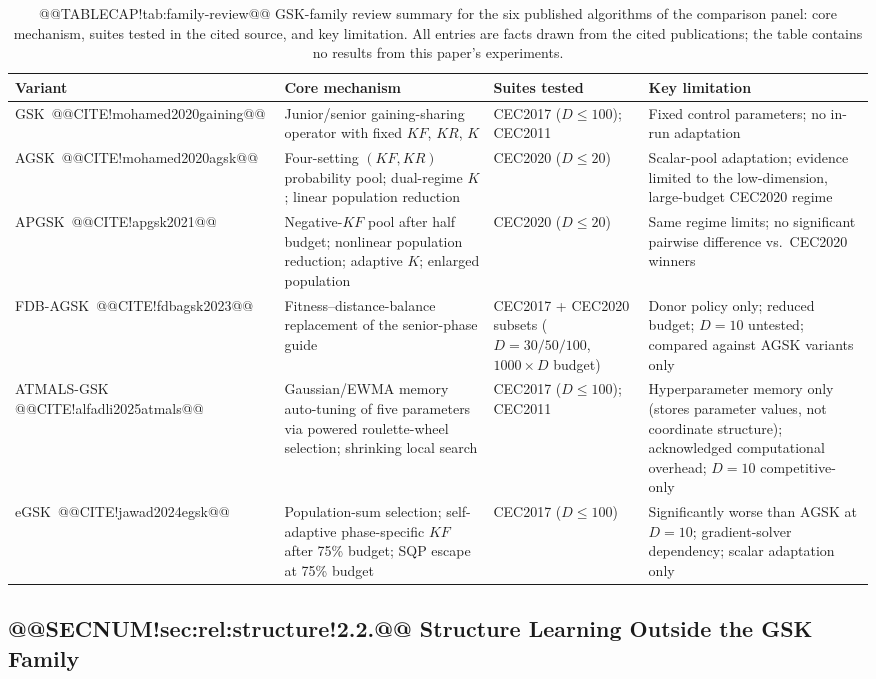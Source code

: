 \documentclass[10pt,a4paper]{article}
\newcommand{\atmals}{ATMALS-GSK}
\newcommand{\agsk}{AGSK}
\newcommand{\apgsk}{APGSK}
\newcommand{\fdbagsk}{FDB-AGSK}
\newcommand{\egsk}{eGSK}
\begin{document}
\begin{table}[H]
\caption{@@TABLECAP!tab:family-review@@ GSK-family review summary for the six published algorithms of
the comparison panel: core mechanism, suites tested in the cited source,
and key limitation. All entries are facts drawn from the cited
publications; the table contains no results from this paper's
experiments.}\label{tab:family-review}
\begin{tabular}{p{1.95cm}p{4.15cm}p{2.6cm}p{4.4cm}}
\toprule
\textbf{Variant} & \textbf{Core mechanism} & \textbf{Suites tested} &
\textbf{Key limitation} \\
\midrule
GSK~@@CITE!mohamed2020gaining@@ & Junior/senior gaining-sharing operator
with fixed $KF$, $KR$, $K$ & CEC2017 ($D \leq 100$); CEC2011 & Fixed
control parameters; no in-run adaptation \\ 
\agsk{}~@@CITE!mohamed2020agsk@@ & Four-setting $(KF, KR)$ probability
pool; dual-regime $K$; linear population reduction & CEC2020
($D \leq 20$) & Scalar-pool adaptation; evidence limited to the
low-dimension, large-budget CEC2020 regime \\ 
\apgsk{}~@@CITE!apgsk2021@@ & Negative-$KF$ pool after half budget;
nonlinear population reduction; adaptive $K$; enlarged population &
CEC2020 ($D \leq 20$) & Same regime limits; no significant pairwise
difference vs.\ CEC2020 winners \\ 
\fdbagsk{}~@@CITE!fdbagsk2023@@ & Fitness--distance-balance replacement of
the senior-phase guide & CEC2017 + CEC2020 subsets ($D = 30/50/100$,
$1000 \times D$ budget) & Donor policy only; reduced budget; $D = 10$
untested; compared against \agsk{} variants only \\ 
\atmals{} @@CITE!alfadli2025atmals@@ & Gaussian/EWMA memory auto-tuning of
five parameters via powered roulette-wheel selection; shrinking local
search & CEC2017 ($D \leq 100$); CEC2011 & Hyperparameter memory only
(stores parameter values, not coordinate structure); acknowledged
computational overhead; $D = 10$ competitive-only \\ 
\egsk{}~@@CITE!jawad2024egsk@@ & Population-sum selection; self-adaptive
phase-specific $KF$ after 75\% budget; SQP escape at 75\% budget &
CEC2017 ($D \leq 100$) & Significantly worse than \agsk{} at $D = 10$;
gradient-solver dependency; scalar adaptation only \\ 
\bottomrule
\end{tabular}
\end{table}


\subsection{@@SECNUM!sec:rel:structure!2.2.@@ Structure Learning Outside the GSK Family}\label{sec:rel:structure}
\end{document}
